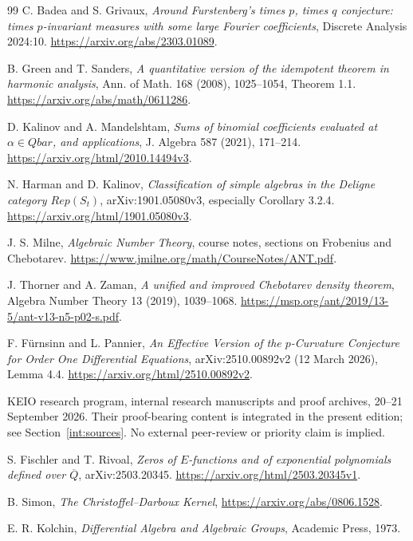 \documentclass[11pt,a4paper]{article}
\newcommand{\QB}{\overline{\mathbb Q}}
\newcommand{\Qbar}{\overline{\mathbb Q}}
\theoremstyle{definition}
\theoremstyle{remark}
\theoremstyle{plain}
\numberwithin{equation}{section}
\def\Qbar{Qbar}\def\QB{Qbar}\def\mathbb#1{#1}%
\def\operatorname#1{#1}\def\mathrm#1{#1}}
\begin{document}
\begin{thebibliography}{99}
 C. Badea and S. Grivaux,
\emph{Around Furstenberg's times $p$, times $q$ conjecture:
times $p$-invariant measures with some large Fourier coefficients},
Discrete Analysis 2024:10.
\url{https://arxiv.org/abs/2303.01089}.

 B. Green and T. Sanders,
\emph{A quantitative version of the idempotent theorem in harmonic analysis},
Ann. of Math. 168 (2008), 1025--1054, Theorem 1.1.
\url{https://arxiv.org/abs/math/0611286}.

 D. Kalinov and A. Mandelshtam,
\emph{Sums of binomial coefficients evaluated at $\alpha\in\Qbar$,
and applications}, J. Algebra 587 (2021), 171--214.
\url{https://arxiv.org/html/2010.14494v3}.

 N. Harman and D. Kalinov,
\emph{Classification of simple algebras in the Deligne category
$\operatorname{Rep}(S_t)$}, arXiv:1901.05080v3,
especially Corollary 3.2.4.
\url{https://arxiv.org/html/1901.05080v3}.

 J. S. Milne, \emph{Algebraic Number Theory},
course notes, sections on Frobenius and Chebotarev.
\url{https://www.jmilne.org/math/CourseNotes/ANT.pdf}.

 J. Thorner and A. Zaman,
\emph{A unified and improved Chebotarev density theorem},
Algebra Number Theory 13 (2019), 1039--1068.
\url{https://msp.org/ant/2019/13-5/ant-v13-n5-p02-s.pdf}.

 F. F\"urnsinn and L. Pannier,
\emph{An Effective Version of the $p$-Curvature Conjecture for Order One
Differential Equations}, arXiv:2510.00892v2 (12 March 2026), Lemma 4.4.
\url{https://arxiv.org/html/2510.00892v2}.

 KEIO research program, internal research manuscripts and proof archives, 20--21 September 2026. Their proof-bearing content is integrated in the present edition; see Section~\ref{int:sources}. No external peer-review or priority claim is implied.

 S. Fischler and T. Rivoal,
\emph{Zeros of $E$-functions and of exponential polynomials defined over
$\overline{\mathbb Q}$}, arXiv:2503.20345.
\url{https://arxiv.org/html/2503.20345v1}.

 B. Simon, \emph{The Christoffel--Darboux Kernel},
\url{https://arxiv.org/abs/0806.1528}.

 E. R. Kolchin, \emph{Differential Algebra and
Algebraic Groups}, Academic Press, 1973.


\end{thebibliography}
\end{document}
